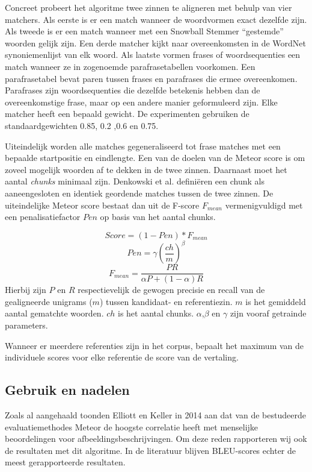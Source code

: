Concreet probeert het algoritme twee zinnen te aligneren met behulp van vier matchers. Als eerste is er een match wanneer de woordvormen exact dezelfde zijn. Als tweede is er een match wanneer met een Snowball Stemmer \cite{porter2001snowball} ``gestemde'' woorden gelijk zijn. Een derde matcher kijkt naar overeenkomsten in de WordNet synoniemenlijst van elk woord. \cite{Miller1990} Als laatste vormen frases of woordsequenties een match wanneer ze in zogenoemde parafrasetabellen voorkomen. Een parafrasetabel bevat paren tussen frases en parafrases die ermee overeenkomen. Parafrases zijn woordsequenties die dezelfde betekenis hebben dan de overeenkomstige frase, maar op een andere manier geformuleerd zijn.
Elke matcher heeft een bepaald gewicht. De experimenten gebruiken de standaardgewichten 0.85, 0.2 ,0.6 en 0.75.

Uiteindelijk worden alle matches gegeneraliseerd tot frase matches met een bepaalde startpositie en eindlengte. Een van de doelen van de Meteor score is om zoveel mogelijk woorden af te dekken in de twee zinnen. Daarnaast moet het aantal \textit{chunks} minimaal zijn. Denkowski et al. defini\"eren een chunk als aaneengesloten en identiek geordende matches tussen de twee zinnen. De uiteindelijke Meteor score bestaat dan uit de F-score $F_{mean}$ vermenigvuldigd met een penalisatiefactor $Pen$ op basis van het aantal chunks.


\begin{equation}
Score = (1 - Pen)*F_{mean}
\end{equation} 
\begin{equation}
Pen = \gamma (\frac{ch}{m})^\beta 
\end{equation}
\begin{equation}
F_{mean} = \frac{PR}{\alpha P + (1- \alpha)R}
\end{equation}
Hierbij zijn $P$ en $R$ respectievelijk de gewogen precisie en recall van de gealigneerde unigrams ($m$) tussen kandidaat- en referentiezin. $m$ is het gemiddeld aantal gematchte woorden. $ch$ is het aantal chunks. $\alpha$,$\beta$ en $\gamma$ zijn vooraf getrainde parameters.

Wanneer er meerdere referenties zijn in het corpus, bepaalt het maximum van de individuele scores voor elke referentie de score van de vertaling.

\subsection{Gebruik en nadelen}
Zoals al aangehaald toonden Elliott en Keller in 2014 aan dat van de bestudeerde evaluatiemethodes Meteor de hoogste correlatie heeft met menselijke beoordelingen voor afbeeldingsbeschrijvingen. Om deze reden rapporteren wij ook de resultaten met dit algoritme. In de literatuur blijven BLEU-scores echter de meest gerapporteerde resultaten.

